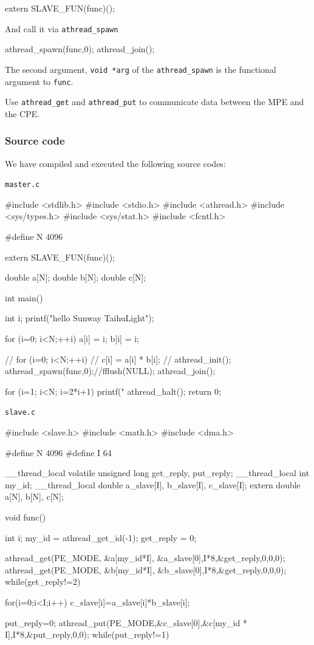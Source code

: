 \begin{code}
extern SLAVE_FUN(func)();
\end{code}

And call it via
\verb`athread_spawn`

\begin{code}
athread_spawn(func,0);
athread_join();
\end{code}

The second argument, \verb`void *arg` of the
\verb`athread_spawn` is the functional argument to \verb`func`.


Use \verb`athread_get` and \verb`athread_put` to communicate data between the MPE and the CPE.





\subsubsection{Source code}
 We have compiled and executed the following source codes:

\verb`master.c`
\begin{code}
#include <stdlib.h>
#include <stdio.h>
#include <athread.h>
#include <sys/types.h>
#include <sys/stat.h>
#include <fcntl.h>

#define N 4096


extern SLAVE_FUN(func)();

double a[N];
double b[N];
double c[N];

int main() {
  int i;
  printf("hello Sunway TaihuLight\n");

  for (i=0; i<N;++i){
    a[i] = i;
    b[i] = i;
  }

  // for (i=0; i<N;++i){
  //   c[i] = a[i] * b[i];
  // }
  athread_init();
  athread_spawn(func,0);//fflush(NULL);
  athread_join();

  for (i=1; i<N; i=2*i+1){
    printf("%
  }
  athread_halt();
  return 0;
}

\end{code}

\verb`slave.c`
\begin{code}
#include <slave.h>
#include <math.h>
#include <dma.h>

#define N 4096
#define I 64

__thread_local volatile unsigned long get_reply, put_reply;
__thread_local int my_id;
__thread_local double a_slave[I], b_slave[I], c_slave[I];
extern double a[N], b[N], c[N];

void func() {
  int i;
  my_id = athread_get_id(-1);
  get_reply = 0;

  athread_get(PE_MODE, &a[my_id*I], &a_slave[0],I*8,&get_reply,0,0,0);
  athread_get(PE_MODE, &b[my_id*I], &b_slave[0],I*8,&get_reply,0,0,0);
  while(get_reply!=2) {}

  for(i=0;i<I;i++){
    c_slave[i]=a_slave[i]*b_slave[i];
  }

  put_reply=0;
  athread_put(PE_MODE,&c_slave[0],&c[my_id * I],I*8,&put_reply,0,0);
  while(put_reply!=1) {}

}

\end{code}

